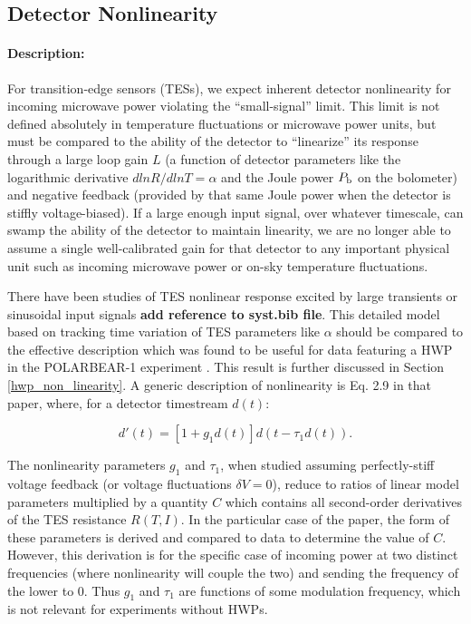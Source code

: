 \subsection{Detector Nonlinearity}
\label{det_nonlinearity}

\paragraph{Description:}
For transition-edge sensors (TESs), we expect inherent detector nonlinearity for incoming microwave power violating the ``small-signal'' limit. This limit is not defined absolutely in temperature fluctuations or microwave power units, but must be compared to the ability of the detector to ``linearize'' its response through a large loop gain $L$ (a function of detector parameters  like the logarithmic derivative $dlnR/dlnT = \alpha$ and the Joule power $ P_{\mbox{\scriptsize b}}$ on the bolometer) and negative feedback (provided by that same Joule power when the detector is stiffly voltage-biased). If a large enough input signal, over whatever timescale, can swamp the ability of the detector to maintain linearity, we are no longer able to assume a single well-calibrated gain for that detector to any important physical unit such as incoming microwave power or on-sky temperature fluctuations.

There have been studies of TES nonlinear response excited by large transients or sinusoidal input signals \cite{Rostem} \textbf{add reference to syst.bib file}. This detailed model based on tracking time variation of TES parameters like $\alpha$ should be compared to the effective description which was found to be useful for data featuring a HWP in the POLARBEAR-1 experiment \cite{PB1_WHWP}. This result is further discussed in Section \ref{hwp_non_linearity}. A generic description of nonlinearity is Eq. 2.9 in that paper, where, for a detector timestream $d(t)$:

\begin{equation}
d'(t) = [ 1 + g_1 d(t) ] d(t - \tau_1 d(t)).
\label{nonlinearity}
\end{equation}

The nonlinearity parameters $g_1$ and $\tau_1$, when studied assuming perfectly-stiff voltage feedback (or voltage fluctuations $\delta V = 0$), reduce to ratios of linear model parameters multiplied by a quantity $C$ which contains all second-order derivatives of the TES resistance $R(T,I)$. In the particular case of the paper, the form of these parameters is derived and compared to data to determine the value of $C$. However, this derivation is for the specific case of incoming power at two distinct frequencies (where nonlinearity will couple the two) and sending the frequency of the lower to 0. Thus $g_1$ and $\tau_1$ are functions of some modulation frequency, which is not relevant for experiments without HWPs.


